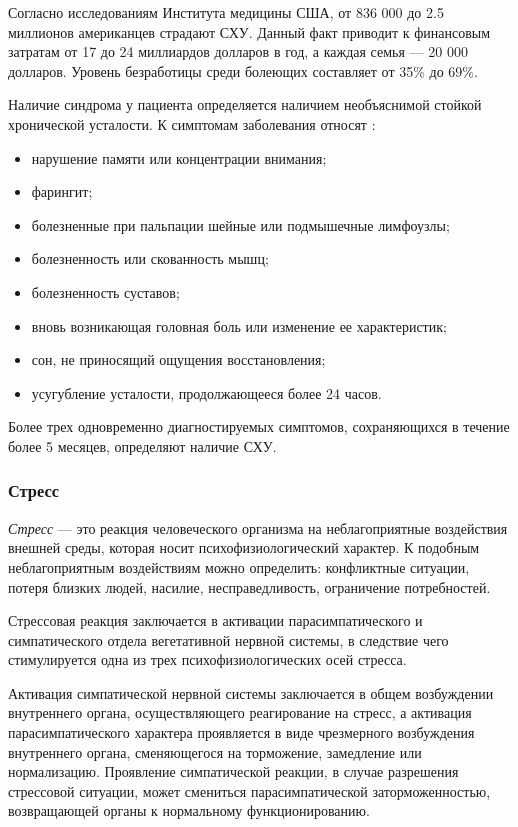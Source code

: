 Согласно исследованиям Института медицины США, от 836 000 до 2.5 миллионов американцев страдают СХУ. Данный факт приводит к финансовым затратам от 17 до 24 миллиардов долларов в год, а каждая семья --- 20 000 долларов. Уровень безработицы среди болеющих составляет от 35\% до 69\%. \cite{fatigueChronoInvestigation}

Наличие синдрома у пациента определяется наличием необъяснимой \newline стойкой хронической усталости. К симптомам заболевания относят \cite{syndromOfChrono}:
\begin{itemize}[leftmargin=1.6\parindent]
\item нарушение памяти или концентрации внимания;
\item фарингит;
\item болезненные при пальпации шейные или подмышечные лимфоузлы;
\item болезненность или скованность мышц;
\item болезненность суставов;
\item вновь возникающая головная боль или изменение ее характеристик;
\item сон, не приносящий ощущения восстановления;
\item усугубление усталости, продолжающееся более 24 часов.
\end{itemize}

Более трех одновременно диагностируемых симптомов, сохраняющихся в течение более 5 месяцев, определяют наличие СХУ. \cite{syndromOfChrono}


\subsubsection{Стресс}
\textit{Стресс} --- это реакция человеческого организма на неблагоприятные воздействия внешней среды, которая носит психофизиологический характер. К подобным неблагоприятным воздействиям можно определить: конфликтные ситуации, потеря близких людей, насилие, несправедливость, ограничение потребностей. \cite{neuroPhysicalMechasmsOfStress}

Стрессовая реакция заключается в активации парасимпатического и симпатического отдела вегетативной нервной системы, в следствие чего стимулируется одна из трех психофизиологических осей стресса. \cite{neuroPhysicalMechasmsOfStress}

Активация симпатической нервной системы заключается в общем возбуждении внутреннего органа, осуществляющего реагирование на стресс, а активация парасимпатического характера проявляется в виде чрезмерного возбуждения внутреннего органа, сменяющегося на торможение, замедление или нормализацию. Проявление симпатической реакции, в случае разрешения стрессовой ситуации, может смениться парасимпатической заторможенностью, возвращающей органы к нормальному функционированию. \cite{neuroPhysicalMechasmsOfStress}

